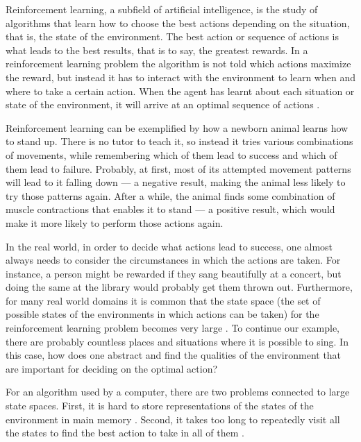 Reinforcement learning, a subfield of artificial intelligence, is the study of algorithms that learn how to choose the best actions depending on the situation, that is, the state of the environment. The best action or sequence of actions is what leads to the best results, that is to say, the greatest rewards. In a reinforcement learning problem the algorithm is not told which actions maximize the reward, but instead it has to interact with the environment to learn when and where to take a certain action. When the agent has learnt about each situation or state of the environment, it will arrive at an optimal sequence of actions \parencite{barto1998reinforcement}.




Reinforcement learning can be exemplified by how a newborn animal learns how to stand up. There is no tutor to teach it, so instead it tries various combinations of movements, while remembering which of them lead to success and which of them lead to failure. Probably, at first, most of its attempted movement patterns will lead to it falling down --- a negative result, making the animal less likely to try those patterns again. After a while, the animal finds some combination of muscle contractions that enables it to stand --- a positive result, which would make it more likely to perform those actions again. 

In the real world, in order to decide what actions lead to success, one almost always needs to consider the circumstances in which the actions are taken. For instance, a person might be rewarded if they sang beautifully at a concert, but doing the same at the library would probably get them thrown out. Furthermore, for many real world domains it is common that the state space (the set of possible states of the environments in which actions can be taken) for the reinforcement learning problem becomes very large \parencite{guestrin2003efficient}. To continue our example, there are probably countless places and situations where it is possible to sing. In this case, how does one abstract and find the qualities of the environment that are important for deciding on the optimal action? 

For an algorithm used by a computer, there are two problems connected to large state spaces. First, it is hard to store representations of the states of the environment in main memory \parencite{szepesvari2010algorithms}. Second, it takes too long to repeatedly visit all the states to find the best action to take in all of them \parencite{dietterich2013pac}.